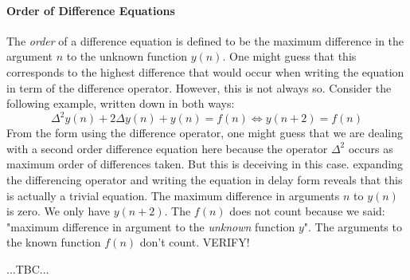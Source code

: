 \paragraph{Order of Difference Equations}
The \emph{order} of a difference equation is defined to be the maximum difference in the argument $n$ to the unknown function $y(n)$. One might guess that this corresponds to the highest difference that would occur when writing the equation in term of the difference operator. However, this is not always so. Consider the following example, written down in both ways:
\begin{equation}
 \Delta^2 y(n) + 2 \Delta y(n) + y(n) = f(n) 
 \Leftrightarrow
 y(n+2) = f(n)
\end{equation}
From the form using the difference operator, one might guess that we are dealing with a second order difference equation here because the operator $\Delta^2$ occurs as maximum order of differences taken. But this is deceiving in this case. expanding the differencing operator and writing the equation in delay form reveals that this is actually a trivial equation. The maximum difference in arguments $n$ to $y(n)$ is zero. We only have $y(n+2)$. The $f(n)$ does not count because we said: "maximum difference in argument to the \emph{unknown} function $y$". The arguments to the known function $f(n)$ don't count. VERIFY! 


...TBC...



